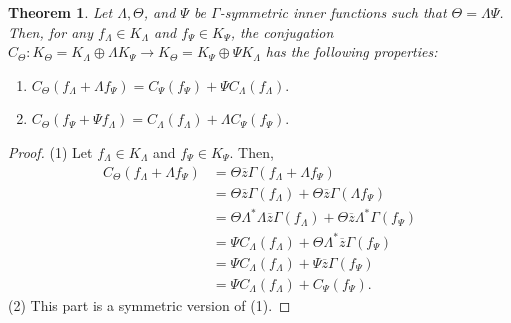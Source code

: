 \documentclass[12pt]{amsart}
\numberwithin{equation}{section}
\newtheorem{theorem}{Theorem}[section]
\theoremstyle{definition}
\numberwithin{equation}{section}
\begin{document}
\medskip

\begin{theorem}\label{ctheta}
Let $\Lambda,\Theta$, and $\Psi$ be $\Gamma$-symmetric inner functions such that $\Theta=\Lambda\Psi$. Then, for
any $f_{\Lambda}\in K_{\Lambda}$ and $f_{\Psi}\in K_{\Psi}$, the conjugation
$C_{\Theta}:K_{\Theta}=K_{\Lambda}\oplus\Lambda K_{\Psi}\to K_{\Theta}=K_{\Psi}\oplus \Psi K_{\Lambda}$ has the following properties:
\begin{enumerate}[(1)]
    \item $C_{\Theta}(f_{\Lambda}+\Lambda f_{\Psi})=C_{\Psi}(f_{\Psi})+\Psi C_{\Lambda}(f_{\Lambda}).$
    \item $C_{\Theta}(f_{\Psi}+\Psi f_{\Lambda})=C_{\Lambda}(f_{\Lambda})+\Lambda C_{\Psi}(f_{\Psi}).$
\end{enumerate}
\end{theorem}
\begin{proof}
(1) Let $f_{\Lambda}\in K_{\Lambda}$ and $f_{\Psi}\in K_{\Psi}$. Then,
\begin{align*}
C_{\Theta}(f_{\Lambda}+\Lambda f_{\Psi})
&=\Theta \overline{z}\Gamma(f_{\Lambda}+\Lambda f_{\Psi})\\
&=\Theta \overline{z}\Gamma(f_{\Lambda})+\Theta \overline{z}\Gamma(\Lambda f_{\Psi})\\
&=\Theta\Lambda^{*}\Lambda \overline{z}\Gamma(f_{\Lambda})+\Theta \overline{z}\Lambda^{*}\Gamma(f_{\Psi})\\
&=\Psi C_{\Lambda} (f_{\Lambda})+\Theta \Lambda^{*}\overline{z}\Gamma(f_{\Psi})\\
&=\Psi C_{\Lambda} (f_{\Lambda})+\Psi\overline{z}\Gamma(f_{\Psi})\\
&=\Psi C_{\Lambda} (f_{\Lambda})+C_{\Psi}(f_{\Psi}).
\end{align*}
(2) This part is a symmetric version of (1).
\end{proof}


\medskip
\end{document}
